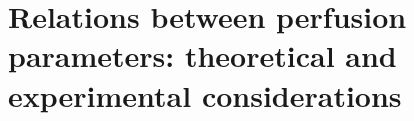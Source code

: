 \chapter{Relations between perfusion parameters: theoretical and experimental considerations}\label{chapter:PMB2}



\newpage

